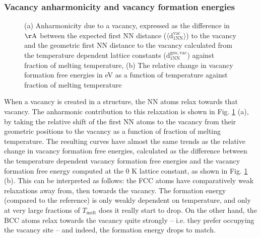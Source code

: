 \documentclass{article}
\begin{document}
\subsubsection{Vacancy anharmonicity and vacancy formation energies}

\begin{figure}[!htp]
\centering
{}
\hfill
\caption{(a) Anharmonicity due to a vacancy, expressed as the difference in $\mathrm{\AA}$ between the expected first NN distance ($\langle \mathrm{d_{1NN}^{vac}} \rangle$) to the vacancy and the geometric first NN distance to the vacancy calculated from the temperature dependent lattice constants ($\mathrm{d_{1NN}^{geo, vac}}$) against fraction of melting temperature, (b) The relative change in vacancy formation free energies in eV as a function of temperature against fraction of melting temperature}
\label{fig:21}
\end{figure}

When a vacancy is created in a structure, the NN atoms relax towards that vacancy. The anharmonic contribution to this relaxation is shown in Fig. \ref{fig:21} (a), by taking the relative shift of the first NN atoms to the vacancy from their geometric positions to the vacancy as a function of fraction of melting temperature. The resulting curves have almost the same trends as the relative change in vacancy formation free energies, calculated as the difference between the temperature dependent vacancy formation free energies and the vacancy formation free energy computed at the 0 K lattice constant, as shown in Fig. \ref{fig:21} (b). This can be interpreted as follows: the FCC atoms have comparatively weak relaxations away from, then towards the vacancy. The formation energy (compared to the reference) is only weakly dependent on temperature, and only at very large fractions of $T_{\mathrm{melt}}$ does it really start to drop. On the other hand, the BCC atoms relax towards the vacancy quite strongly -- i.e. they prefer occupying the vacancy site  -- and indeed, the formation energy drops to match.
\end{document}
